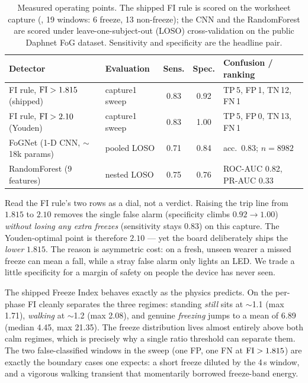 \begin{table}[H]
\centering
\caption{Measured operating points. The shipped FI rule is scored on the worksheet
capture (, 19 windows: 6 freeze, 13 non-freeze); the CNN and the
RandomForest are scored under leave-one-subject-out (LOSO) cross-validation on the
public Daphnet FoG dataset. Sensitivity and specificity are the headline pair.}
\label{tab:results-summary}
\small
\setlength{\tabcolsep}{5pt}
\begin{tabular}{@{}llccl@{}}
\toprule
\textbf{Detector} & \textbf{Evaluation} & \textbf{Sens.} & \textbf{Spec.} &
\textbf{Confusion / ranking} \\
\midrule
FI rule, $\mathrm{FI}>1.815$ (shipped)     & capture1 sweep & 0.83 & 0.92 & TP\,5, FP\,1, TN\,12, FN\,1 \\
FI rule, $\mathrm{FI}>2.10$ (Youden)       & capture1 sweep & 0.83 & 1.00 & TP\,5, FP\,0, TN\,13, FN\,1 \\
FoGNet (1-D CNN, $\sim$18k params) & pooled LOSO    & 0.71 & 0.84 & acc.\ 0.83; $n=8982$ \\
RandomForest (9 features)          & nested LOSO    & 0.75 & 0.76 & ROC-AUC 0.82, PR-AUC 0.33 \\
\bottomrule
\end{tabular}
\end{table}

\begin{intuition}
Read the FI rule's two rows as a dial, not a verdict. Raising the trip line from
$1.815$ to $2.10$ removes the single false alarm (specificity climbs $0.92\!\to\!1.00$)
\emph{without losing any extra freezes} (sensitivity stays $0.83$) on this capture. The
Youden-optimal point is therefore $2.10$ --- yet the board deliberately ships the
\emph{lower} $1.815$. The reason is asymmetric cost: on a fresh, unseen wearer a missed
freeze can mean a fall, while a stray false alarm only lights an LED. We trade a little
specificity for a margin of safety on people the device has never seen.
\end{intuition}

The shipped Freeze Index behaves exactly as the physics predicts. On
 the per-phase FI cleanly separates the three regimes: standing
\emph{still} sits at $\sim$1.1 (max 1.71), \emph{walking} at $\sim$1.2 (max 2.08), and
genuine \emph{freezing} jumps to a mean of 6.89 (median 4.45, max 21.35). The freeze
distribution lives almost entirely above both calm regimes, which is precisely why a
single ratio threshold can separate them. The two false-classified windows in the sweep
(one FP, one FN at $\mathrm{FI}>1.815$) are exactly the boundary cases one expects: a short
freeze diluted by the 4\,s window, and a vigorous walking transient that momentarily
borrowed freeze-band energy.

